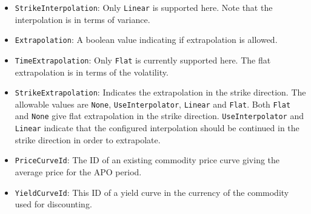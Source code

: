 \begin{itemize}
\item \lstinline!StrikeInterpolation!:
Only \lstinline!Linear! is supported here. Note that the interpolation is in terms of variance.

\item \lstinline!Extrapolation!:
A boolean value indicating if extrapolation is allowed.

\item \lstinline!TimeExtrapolation!:
Only \lstinline!Flat! is currently supported here. The flat extrapolation is in terms of the volatility.

\item \lstinline!StrikeExtrapolation!:
Indicates the extrapolation in the strike direction. The allowable values are \lstinline!None!, \lstinline!UseInterpolator!, \lstinline!Linear! and \lstinline!Flat!. Both \lstinline!Flat! and \lstinline!None! give flat extrapolation in the strike direction. \lstinline!UseInterpolator! and \lstinline!Linear! indicate that the configured interpolation should be continued in the strike direction in order to extrapolate.

\item \lstinline!PriceCurveId!:
The ID of an existing commodity price curve giving the average price for the APO period.

\item \lstinline!YieldCurveId!:
This ID of a yield curve in the currency of the commodity used for discounting.

\end{itemize}